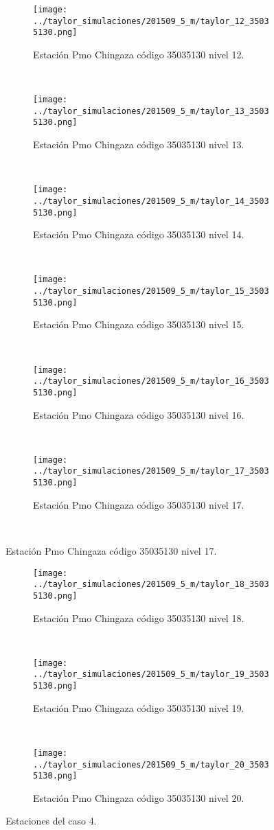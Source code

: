 \begin{figure}[H]
\centering
\begin{subfigure}[normla]{0.4\textwidth}
\caption{Estación Pmo Chingaza  código 35035130 nivel 12.}
\texttt{[image: ../taylor\_simulaciones/201509\_5\_m/taylor\_12\_35035130.png]}
\end{subfigure}
~
\begin{subfigure}[normla]{0.4\textwidth}
\caption{Estación Pmo Chingaza  código 35035130 nivel 13.}
\texttt{[image: ../taylor\_simulaciones/201509\_5\_m/taylor\_13\_35035130.png]}
\end{subfigure}
~
\begin{subfigure}[normla]{0.4\textwidth}
\caption{Estación Pmo Chingaza  código 35035130 nivel 14.}
\texttt{[image: ../taylor\_simulaciones/201509\_5\_m/taylor\_14\_35035130.png]}
\end{subfigure}
~
\begin{subfigure}[normla]{0.4\textwidth}
\caption{Estación Pmo Chingaza  código 35035130 nivel 15.}
\texttt{[image: ../taylor\_simulaciones/201509\_5\_m/taylor\_15\_35035130.png]}
\end{subfigure}
~
\begin{subfigure}[normla]{0.4\textwidth}
\caption{Estación Pmo Chingaza  código 35035130 nivel 16.}
\texttt{[image: ../taylor\_simulaciones/201509\_5\_m/taylor\_16\_35035130.png]}
\end{subfigure}
~
\begin{subfigure}[normla]{0.4\textwidth}
\caption{Estación Pmo Chingaza  código 35035130 nivel 17.}
\texttt{[image: ../taylor\_simulaciones/201509\_5\_m/taylor\_17\_35035130.png]}
\end{subfigure}
~
\end{figure}
           
\begin{figure}[H]\ContinuedFloat
\centering
\begin{subfigure}[normla]{0.4\textwidth}
\caption{Estación Pmo Chingaza  código 35035130 nivel 18.}
\texttt{[image: ../taylor\_simulaciones/201509\_5\_m/taylor\_18\_35035130.png]}
\end{subfigure}
~
\begin{subfigure}[normla]{0.4\textwidth}
\caption{Estación Pmo Chingaza  código 35035130 nivel 19.}
\texttt{[image: ../taylor\_simulaciones/201509\_5\_m/taylor\_19\_35035130.png]}
\end{subfigure}
~
\begin{subfigure}[normla]{0.4\textwidth}
\caption{Estación Pmo Chingaza  código 35035130 nivel 20.}
\texttt{[image: ../taylor\_simulaciones/201509\_5\_m/taylor\_20\_35035130.png]}
\end{subfigure}	

\caption{Estaciones del caso 4.}
\label{estaciones_caso1}
\end{figure}